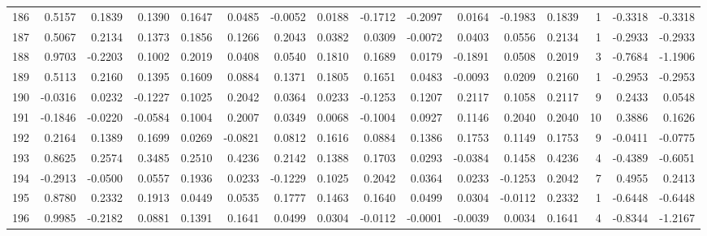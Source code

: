 \begin{tabular}{lrrrrrrrrrrrrrrr}
186 &      0.5157 &  0.1839 &  0.1390 &  0.1647 &  0.0485 & -0.0052 &  0.0188 & -0.1712 & -0.2097 &  0.0164 &  -0.1983 &     0.1839 &      1 &                   -0.3318 &                    -0.3318 \\
187 &      0.5067 &  0.2134 &  0.1373 &  0.1856 &  0.1266 &  0.2043 &  0.0382 &  0.0309 & -0.0072 &  0.0403 &   0.0556 &     0.2134 &      1 &                   -0.2933 &                    -0.2933 \\
188 &      0.9703 & -0.2203 &  0.1002 &  0.2019 &  0.0408 &  0.0540 &  0.1810 &  0.1689 &  0.0179 & -0.1891 &   0.0508 &     0.2019 &      3 &                   -0.7684 &                    -1.1906 \\
189 &      0.5113 &  0.2160 &  0.1395 &  0.1609 &  0.0884 &  0.1371 &  0.1805 &  0.1651 &  0.0483 & -0.0093 &   0.0209 &     0.2160 &      1 &                   -0.2953 &                    -0.2953 \\
190 &     -0.0316 &  0.0232 & -0.1227 &  0.1025 &  0.2042 &  0.0364 &  0.0233 & -0.1253 &  0.1207 &  0.2117 &   0.1058 &     0.2117 &      9 &                    0.2433 &                     0.0548 \\
191 &     -0.1846 & -0.0220 & -0.0584 &  0.1004 &  0.2007 &  0.0349 &  0.0068 & -0.1004 &  0.0927 &  0.1146 &   0.2040 &     0.2040 &     10 &                    0.3886 &                     0.1626 \\
192 &      0.2164 &  0.1389 &  0.1699 &  0.0269 & -0.0821 &  0.0812 &  0.1616 &  0.0884 &  0.1386 &  0.1753 &   0.1149 &     0.1753 &      9 &                   -0.0411 &                    -0.0775 \\
193 &      0.8625 &  0.2574 &  0.3485 &  0.2510 &  0.4236 &  0.2142 &  0.1388 &  0.1703 &  0.0293 & -0.0384 &   0.1458 &     0.4236 &      4 &                   -0.4389 &                    -0.6051 \\
194 &     -0.2913 & -0.0500 &  0.0557 &  0.1936 &  0.0233 & -0.1229 &  0.1025 &  0.2042 &  0.0364 &  0.0233 &  -0.1253 &     0.2042 &      7 &                    0.4955 &                     0.2413 \\
195 &      0.8780 &  0.2332 &  0.1913 &  0.0449 &  0.0535 &  0.1777 &  0.1463 &  0.1640 &  0.0499 &  0.0304 &  -0.0112 &     0.2332 &      1 &                   -0.6448 &                    -0.6448 \\
196 &      0.9985 & -0.2182 &  0.0881 &  0.1391 &  0.1641 &  0.0499 &  0.0304 & -0.0112 & -0.0001 & -0.0039 &   0.0034 &     0.1641 &      4 &                   -0.8344 &                    -1.2167 \\

\end{tabular}

